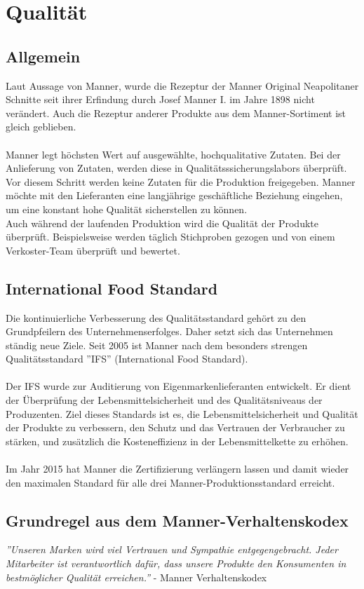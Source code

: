 \section{Qualität}
\subsection{Allgemein}
Laut Aussage von Manner, wurde die Rezeptur der Manner Original Neapolitaner Schnitte seit ihrer Erfindung durch Josef Manner I. im Jahre 1898 nicht verändert. Auch die Rezeptur anderer Produkte aus dem Manner-Sortiment ist gleich geblieben. \cite{josef_manner_unternehmen} \\\\
\noindent
Manner legt höchsten Wert auf ausgewählte, hochqualitative Zutaten. Bei der Anlieferung von Zutaten, werden diese in Qualitätsssicherungslabors überprüft. Vor diesem Schritt werden keine Zutaten für die Produktion freigegeben. Manner möchte mit den Lieferanten eine langjährige geschäftliche Beziehung eingehen, um eine konstant hohe Qualität sicherstellen zu können. \cite{josef_manner_unternehmen} \\
Auch während der laufenden Produktion wird die Qualität der Produkte überprüft. Beispielsweise werden täglich Stichproben gezogen und von einem Verkoster-Team überprüft und bewertet. \cite{josef_manner_unternehmen}
\subsection{International Food Standard}
Die kontinuierliche Verbesserung des Qualitätsstandard gehört zu den Grundpfeilern des Unternehmenserfolges. Daher setzt sich das Unternehmen ständig neue Ziele. Seit 2005 ist Manner nach dem besonders strengen Qualitätsstandard ''IFS'' (International Food Standard).\cite{josef_manner_unternehmen}\\\\
\noindent
Der IFS wurde zur Auditierung von Eigenmarkenlieferanten entwickelt. Er dient der Überprüfung der Lebensmittelsicherheit und des Qualitätsniveaus der Produzenten. Ziel dieses Standards ist es, die Lebensmittelsicherheit und Qualität der Produkte zu verbessern, den Schutz und das Vertrauen der Verbraucher zu stärken, und zusätzlich die Kosteneffizienz in der Lebensmittelkette zu erhöhen. \cite{qualityaustria_ifs}\\\\
Im Jahr 2015 hat Manner die Zertifizierung verlängern lassen und damit wieder den maximalen Standard für alle drei Manner-Produktionsstandard erreicht.
\subsection{Grundregel aus dem Manner-Verhaltenskodex}

\textit{''Unseren Marken wird viel Vertrauen und Sympathie entgegengebracht. Jeder Mitarbeiter ist verantwortlich dafür, dass unsere Produkte den Konsumenten in bestmöglicher Qualität erreichen.''} - Manner Verhaltenskodex \cite{josef_manner_unternehmen}